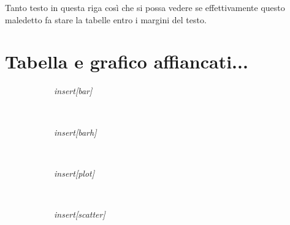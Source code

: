 \documentclass[a4paper, 10pt]{article}
\newcommand{\SRE}[1]{\textit{insert[#1]}}
\begin{document}
Tanto testo in questa riga così che si possa vedere se effettivamente questo maledetto fa stare la tabelle entro i margini del testo.

\tabulinesep=1.5mm

\section*{Tabella e grafico affiancati...}
\begin{figure}[h!]
  \begin{subfigure}[cm]{0.5\linewidth}
    \SRE{bar}
  \end{subfigure}
  ~
  \begin{subfigure}[cm]{0.5\linewidth}    
      \SRE{barh}
  \end{subfigure}
  \\
  \begin{subfigure}[cm]{0.5\linewidth}    
      \SRE{plot}
  \end{subfigure}
  ~ %
  \begin{subfigure}[cm]{0.5\linewidth}    
      \SRE{scatter}
  \end{subfigure}
\end{figure}
\end{document}
